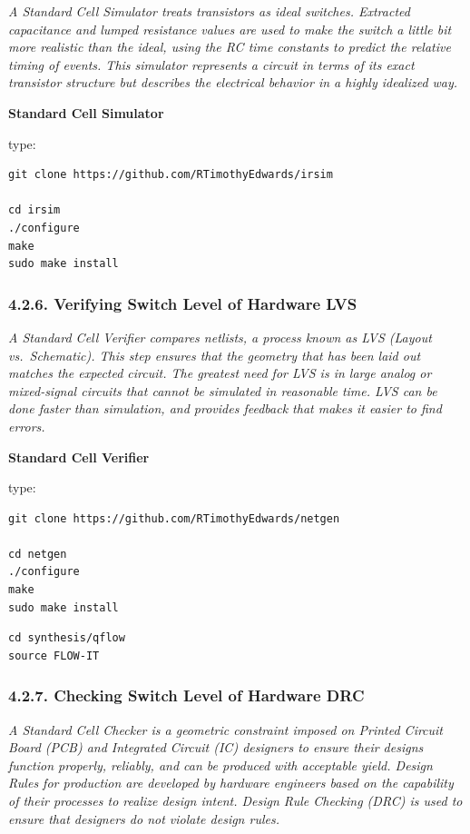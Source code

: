 \documentclass[]{article}
\begin{document}
\emph{A Standard Cell Simulator treats transistors as ideal switches.
Extracted capacitance and lumped resistance values are used to make the
switch a little bit more realistic than the ideal, using the RC time
constants to predict the relative timing of events. This simulator
represents a circuit in terms of its exact transistor structure but
describes the electrical behavior in a highly idealized way.}

\textbf{Standard Cell Simulator}

type:

\begin{verbatim}
git clone https://github.com/RTimothyEdwards/irsim

cd irsim
./configure
make
sudo make install
\end{verbatim}

\subsubsection{4.2.6. Verifying Switch Level of Hardware
LVS}\label{verifying-switch-level-of-hardware-lvs}

\emph{A Standard Cell Verifier compares netlists, a process known as LVS
(Layout vs.~Schematic). This step ensures that the geometry that has
been laid out matches the expected circuit. The greatest need for LVS is
in large analog or mixed-signal circuits that cannot be simulated in
reasonable time. LVS can be done faster than simulation, and provides
feedback that makes it easier to find errors.}

\textbf{Standard Cell Verifier}

type:

\begin{verbatim}
git clone https://github.com/RTimothyEdwards/netgen

cd netgen
./configure
make
sudo make install
\end{verbatim}

\begin{verbatim}
cd synthesis/qflow
source FLOW-IT
\end{verbatim}

\subsubsection{4.2.7. Checking Switch Level of Hardware
DRC}\label{checking-switch-level-of-hardware-drc}

\emph{A Standard Cell Checker is a geometric constraint imposed on
Printed Circuit Board (PCB) and Integrated Circuit (IC) designers to
ensure their designs function properly, reliably, and can be produced
with acceptable yield. Design Rules for production are developed by
hardware engineers based on the capability of their processes to realize
design intent. Design Rule Checking (DRC) is used to ensure that
designers do not violate design rules.}
\end{document}
